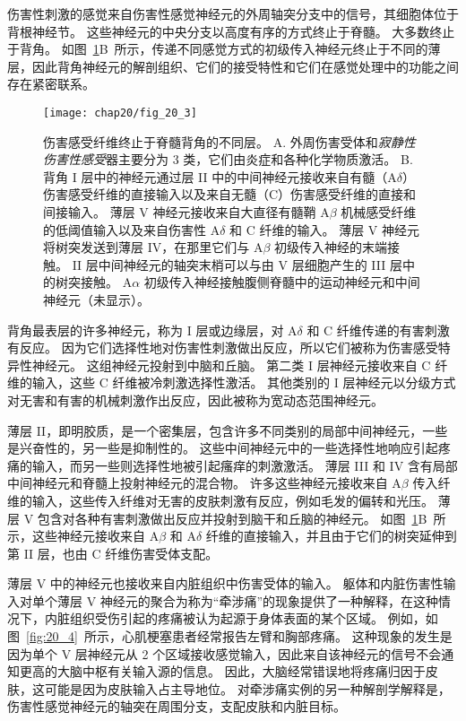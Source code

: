 伤害性刺激的感觉来自伤害性感觉神经元的外周轴突分支中的信号，其细胞体位于背根神经节。
这些神经元的中央分支以高度有序的方式终止于脊髓。
大多数终止于背角。
如图~\ref{fig:20_3}B~所示，传递不同感觉方式的初级传入神经元终止于不同的薄层，因此背角神经元的解剖组织、它们的接受特性和它们在感觉处理中的功能之间存在紧密联系。


\begin{figure}[htbp]
	\centering
	\texttt{[image: chap20/fig\_20\_3]}
	\caption{伤害感受纤维终止于脊髓背角的不同层。
		A. 外周伤害受体和\textit{寂静性伤害性感受}器主要分为 3 类，它们由炎症和各种化学物质激活。
		B. 背角 I 层中的神经元通过层 II 中的中间神经元接收来自有髓（A$ \delta $）伤害感受纤维的直接输入以及来自无髓（C）伤害感受纤维的直接和间接输入。
		薄层 V 神经元接收来自大直径有髓鞘 A$ \beta $ 机械感受纤维的低阈值输入以及来自伤害性 A$ \delta $ 和 C 纤维的输入。
		薄层 V 神经元将树突发送到薄层 IV，在那里它们与 A$ \beta $ 初级传入神经的末端接触。
		II 层中间神经元的轴突末梢可以与由 V 层细胞产生的 III 层中的树突接触。
		A$ \alpha $ 初级传入神经接触腹侧脊髓中的运动神经元和中间神经元（未显示）\cite{fields1987painful}。}
	\label{fig:20_3}
\end{figure}


背角最表层的许多神经元，称为 I 层或边缘层，对 A$ \delta $ 和 C 纤维传递的有害刺激有反应。
因为它们选择性地对伤害性刺激做出反应，所以它们被称为伤害感受特异性神经元。
这组神经元投射到中脑和丘脑。
第二类 I 层神经元接收来自 C 纤维的输入，这些 C 纤维被冷刺激选择性激活。
其他类别的 I 层神经元以分级方式对无害和有害的机械刺激作出反应，因此被称为宽动态范围神经元。


薄层 II，即明胶质，是一个密集层，包含许多不同类别的局部中间神经元，一些是兴奋性的，另一些是抑制性的。
这些中间神经元中的一些选择性地响应引起疼痛的输入，而另一些则选择性地被引起瘙痒的刺激激活。
薄层 III 和 IV 含有局部中间神经元和脊髓上投射神经元的混合物。
许多这些神经元接收来自 A$ \beta $ 传入纤维的输入，这些传入纤维对无害的皮肤刺激有反应，例如毛发的偏转和光压。
薄层 V 包含对各种有害刺激做出反应并投射到脑干和丘脑的神经元。
如图~\ref{fig:20_3}B~所示，这些神经元接收来自 A$ \beta $ 和 A$\delta$ 纤维的直接输入，并且由于它们的树突延伸到第 II 层，也由 C 纤维伤害受体支配。


薄层 V 中的神经元也接收来自内脏组织中伤害受体的输入。
躯体和内脏伤害性输入对单个薄层 V 神经元的聚合为称为“牵涉痛”的现象提供了一种解释，在这种情况下，内脏组织受伤引起的疼痛被认为起源于身体表面的某个区域。 
例如，如图~\ref{fig:20_4}~所示，心肌梗塞患者经常报告左臂和胸部疼痛。
这种现象的发生是因为单个 V 层神经元从 2 个区域接收感觉输入，因此来自该神经元的信号不会通知更高的大脑中枢有关输入源的信息。
因此，大脑经常错误地将疼痛归因于皮肤，这可能是因为皮肤输入占主导地位。
对牵涉痛实例的另一种解剖学解释是，伤害性感觉神经元的轴突在周围分支，支配皮肤和内脏目标。



